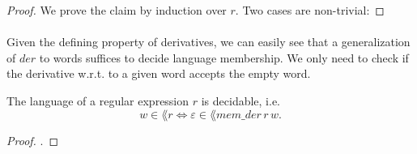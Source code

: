 \documentclass[11pt,a4paper,oneside]{book}
\begin{document}
                    \begin{proof}
                        We prove the claim by induction over $r$. Two cases are non-trivial: 
                    \end{proof}

                \paragraph{} 
                    Given the defining property of derivatives, we can easily see that a generalization of $der$ to words suffices to decide language membership. We only need to check if the derivative w.r.t. to a given word accepts the empty word.


                \begin{theorem}
                    \label{mem_der_correct} 
                    The language of a regular expression $r$ is decidable, i.e.
                    \[
                        w \in \lang{r} \Leftrightarrow \varepsilon \in \lang{mem\_der \, r \, w}.
                    \]
                \end{theorem}
                \begin{proof}
                    .
                \end{proof}
\end{document}
